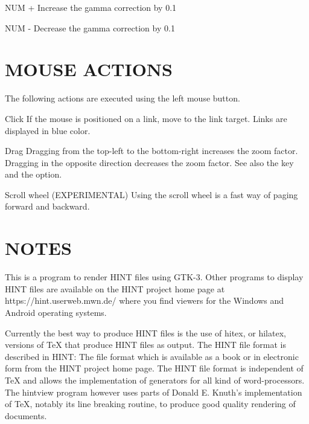 \item{NUM +}  Increase the gamma correction by 0.1

\item{NUM -}  Decrease the gamma correction by 0.1
  
\enditemize


\section{MOUSE ACTIONS}
       The following actions are executed using the left mouse button.

\itemize
         
\item{Click}  If the mouse is positioned on a link, move to the  link  target.
              Links are displayed in blue color.

\item{Drag}   Dragging  from  the  top-left  to the bottom-right increases the
              zoom factor.  Dragging in the opposite direction  decreases  the
              zoom factor. See also the  key and the  option.

\item{Scroll} wheel (EXPERIMENTAL)
              Using the scroll wheel is a fast way of paging forward and backward.
              
\enditemize

              
\section{NOTES}
       This is a program to render HINT files using GTK-3. Other  programs  to
       display  HINT  files  are  available  on  the HINT project home page at
       https://hint.userweb.mwn.de/ where you find viewers for the Windows and
       Android operating systems.

       Currently  the  best  way to produce HINT files is the use of hitex, or
       hilatex, versions of TeX that produce HINT files as  output.  The  HINT
       file format is described in HINT: The file format which is available as
       a book or in electronic form from the HINT project home page. The  HINT
       file format is independent of TeX and allows the implementation of
       generators for all kind of word-processors. The hintview  program  however
       uses parts of Donald E. Knuth's implementation of TeX, notably its line
       breaking routine, to produce good quality rendering of documents.

